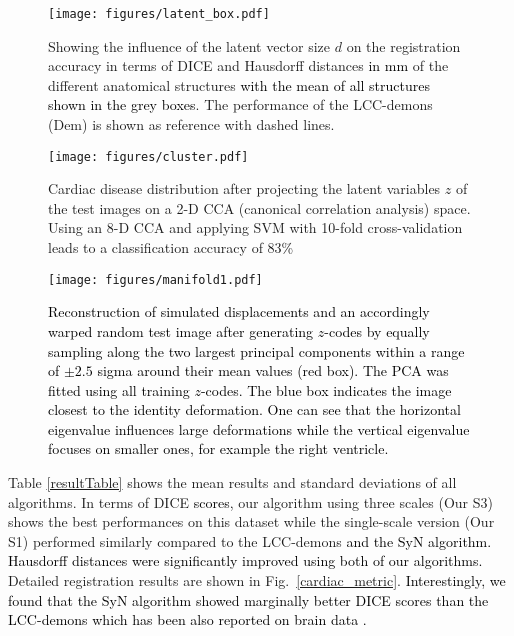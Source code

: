 \documentclass[journal]{IEEEtran}
\newcommand{\update}[1]{\textcolor{black}{#1}}
\begin{document}
\begin{figure}[tb]
\centering 
\texttt{[image: figures/latent\_box.pdf]}
\caption{\small{Showing the influence of the latent vector size $d$ on the registration accuracy in terms of DICE and Hausdorff distances \update{in mm} of the different anatomical structures \update{with the mean of all structures shown in the grey boxes}. The performance of the LCC-demons (Dem) is shown as reference with dashed lines.}}\label{latent_code_analysis}
\end{figure}
\begin{figure}[tb]
\centering
\texttt{[image: figures/cluster.pdf]}
\caption{\small{Cardiac disease distribution after projecting the latent variables $z$ of the test images on a 2-D CCA (canonical correlation analysis) space. Using an 8-D CCA and applying SVM with 10-fold cross-validation leads to a classification accuracy of 83\%}}\label{cluster}
\end{figure}
\begin{figure*}[tb]
\centering 
\texttt{[image: figures/manifold1.pdf]}
\caption{\textcolor{black}{\small{\update{Reconstruction of simulated displacements and an accordingly warped random test image after generating $z$-codes by equally sampling along the two largest principal components within a range of $\pm2.5$ sigma around their mean values (red box). The PCA was fitted using all training $z$-codes}. The blue box indicates the image closest to the identity deformation. One can see that the horizontal eigenvalue influences large deformations while the vertical eigenvalue focuses on smaller ones, for example the right ventricle.}}}\label{manifold}
\end{figure*}

Table \ref{resultTable} shows the mean results and standard deviations of all algorithms. In terms of DICE \update{scores}, our algorithm using three scales (Our S3) shows the best performances on this dataset while the single-scale version (Our S1) performed similarly compared to the LCC-demons \update{and the SyN algorithm. Hausdorff distances were significantly improved using both of our algorithms.} Detailed registration results are shown in Fig.~\ref{cardiac_metric}. \update{Interestingly, we found that the SyN algorithm showed marginally better DICE scores than the LCC-demons which has been also reported on brain data \cite{lorenzi2013lcc}.}
\end{document}
